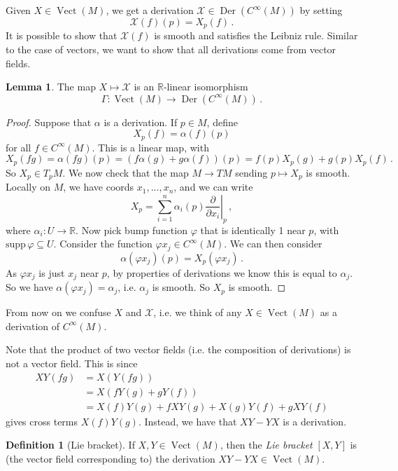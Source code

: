 \documentclass[a4paper,11pt]{article}
\theoremstyle{definition}
\newtheorem*{defn}{Definition}
\newtheorem*{lem}{Lemma}
\DeclareMathOperator{\Vect}{Vect}
\DeclareMathOperator{\Der}{Der}
\numberwithin{equation}{section}
\begin{document}
Given $X\in\Vect(M)$, we get a derivation $\mathcal{X}\in\Der(C^\infty(M))$ by setting
\[
\mathcal{X}(f)(p)=X_p(f)\,.
\]
It is possible to show that $\mathcal{X}(f)$ is smooth and satisfies the Leibniz rule. Similar to the case of vectors, we want to show that all derivations come from vector fields.

\begin{lem}
The map $X\mapsto\mathcal{X}$ is an $\mathbb{R}$-linear isomorphism
\[
\Gamma:\Vect(M)\rightarrow\Der(C^\infty(M))\,.
\]
\end{lem}

\begin{proof}
Suppose that $\alpha$ is a derivation. If $p\in M$, define
\[
X_p(f)=\alpha(f)(p)
\]
for all $f\in C^\infty(M)$. This is a linear map, with
\[
X_p(fg)=\alpha(fg)(p)=(f\alpha(g)+g\alpha(f))(p)=f(p)X_p(g)+g(p)X_p(f)\,.
\]
So $X_p\in T_pM$. We now check that the map $M\rightarrow TM$ sending $p\mapsto X_p$ is smooth. Locally on $M$, we have coords $x_1,...,x_n$, and we can write
\[
X_p=\sum_{i=1}^n\alpha_i(p)\left.\frac{\partial}{\partial x_i}\right|_p\,,
\]
where $\alpha_i:U\rightarrow\mathbb{R}$. Now pick bump function $\varphi$ that is identically 1 near $p$, with $\text{supp}\,\varphi\subseteq U$. Consider the function $\varphi x_j\in C^\infty(M)$. We can then consider
\[
\alpha(\varphi x_j)(p)=X_p(\varphi x_j)\,.
\]
As $\varphi x_j$ is just $x_j$ near $p$, by properties of derivations we know this is equal to $\alpha_j$. So we have $\alpha(\varphi x_j)=\alpha_j$, i.e. $\alpha_j$ is smooth. So $X_p$ is smooth.
\end{proof}

From now on we confuse $X$ and $\mathcal{X}$, i.e. we think of any $X\in\Vect(M)$ as a derivation of $C^\infty(M)$.

Note that the product of two vector fields (i.e. the composition of derivations) is not a vector field. This is since
\begin{align*}
    XY(fg)&=X(Y(fg))\\
    &=X(fY(g)+gY(f))\\
    &=X(f)Y(g)+fXY(g)+X(g)Y(f)+gXY(f)
\end{align*}
gives cross terms $X(f)Y(g)$. Instead, we have that $XY-YX$ is a derivation.

\begin{defn}[Lie bracket]
If $X,Y\in\Vect(M)$, then the \emph{Lie bracket} $[X,Y]$ is (the vector field corresponding to) the derivation $XY-YX\in\Vect(M)$.
\end{defn}
\end{document}
